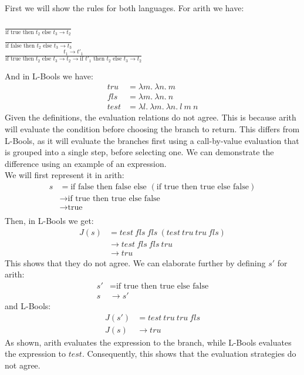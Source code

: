 \documentclass[letterpaper]{article}
\theoremstyle{plain}
\theoremstyle{definition}
\theoremstyle{remark}
\begin{document}
First we will show the rules for both languages. For arith we have:
\begin{center}
    $\frac{}{\text{if true then $t_2$ else $t_3\to{t_2}$}}$\\[1em]
    $\frac{}{\text{if false then $t_2$ else $t_3\to{t_3}$}}$\\[1em]
    $\frac{t_1\to{t'_1}}{\text{if true then $t_2$ else $t_3\to{t_2}$}\to\text{if $t'_1$ then $t_2$ else $t_3\to{t_2}$}}$
\end{center}
And in L-Bools we have:
\begin{align*}
    tru &= \lambda{m}.~\lambda{n}.~m\\
    fls &= \lambda{m}.~\lambda{n}.~n\\
    test &= \lambda{l}.~\lambda{m}.~\lambda{n}.~l~m~n
\end{align*}
Given the definitions, the evaluation relations do not agree. This is because arith will evaluate the condition before choosing the branch to return. This differs from L-Bools, as it will evaluate the branches first using a call-by-value evaluation that is grouped into a single step, before selecting one. We can demonstrate the difference using an example of an expression.\\[1em]
We will first represent it in arith:
\begin{align*}
    s &=\text{if false then false else }(\text{if true then true else false})\\
    &\to \text{if true then true else false}\\
    &\to \text{true}\\
\end{align*}
Then, in L-Bools we get:
\begin{align*}
    J(s) &= test~fls~fls~(test~tru~tru~fls)\\
    &\to test~fls~fls~tru\\
    &\to tru
\end{align*}
This shows that they do not agree. We can elaborate further by defining $s'$ for arith:
\begin{align*}
    s' &= \text{if true then true else false}\\
    s &\to s'
\end{align*}
and L-Bools:
\begin{align*}
    J(s') &= test~tru~tru~fls\\
    J(s) &\to tru
\end{align*}
As shown, arith evaluates the expression to the branch, while L-Bools evaluates the expression to $test$. Consequently, this shows that the evaluation strategies do not agree.
\end{document}
